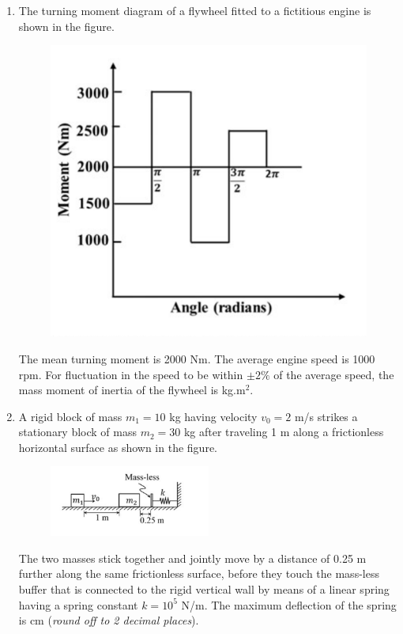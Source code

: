 \documentclass[12pt,onecolumn]{article}
\begin{document}
\begin{enumerate}
    \item The turning moment diagram of a flywheel fitted to a fictitious engine is shown in the figure.
          \begin{figure}[H]
              \centering
              \includegraphics[scale=0.4]{q39s2}
              \label{fig:q39s2}
          \end{figure}
          The mean turning moment is 2000 Nm. The average engine speed is 1000 rpm. For fluctuation in the speed to be within $\pm2\%$ of the average speed, the mass moment of inertia of the flywheel is \underline{\hspace{2cm}} kg.m$^2$.

    \item A rigid block of mass $m_1 = 10$ kg having velocity $v_0 = 2$ m/s strikes a stationary block of mass $m_2 = 30$ kg after traveling 1 m along a frictionless horizontal surface as shown in the figure.
          \begin{figure}[H]
              \centering
              \includegraphics[width=0.5\textwidth]{q40s2}
              \label{fig:q40s2}
          \end{figure}
          The two masses stick together and jointly move by a distance of 0.25 m further along the same frictionless surface, before they touch the mass-less buffer that is connected to the rigid vertical wall by means of a linear spring having a spring constant $k = 10^5$ N/m. The maximum deflection of the spring is \underline{\hspace{2cm}} cm (\textit{round off to 2 decimal places}).


\end{enumerate}
\end{document}
